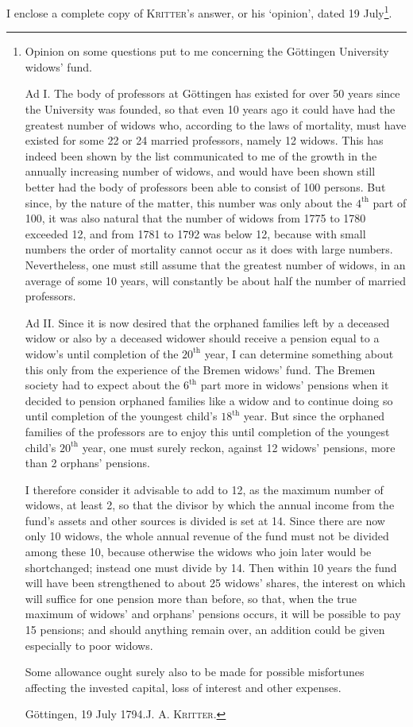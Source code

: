 I enclose a complete copy of \textsc{Kritter}'s answer, or his ‘opinion’, dated 19 July\footnote{Opinion on some questions put to me concerning the Göttingen University widows' fund.

Ad I. The body of professors at Göttingen has existed for over 50 years since the University was founded, so that even 10 years ago it could have had the greatest number of widows who, according to the laws of mortality, must have existed for some 22 or 24 married professors, namely 12 widows. This has indeed been shown by the list communicated to me of the growth in the annually increasing number of widows, and would have been shown still better had the body of professors been able to consist of 100 persons. But since, by the nature of the matter, this number was only about the \(4^{\text{th}}\) part of 100, it was also natural that the number of widows from 1775 to 1780 exceeded 12, and from 1781 to 1792 was below 12, because with small numbers the order of mortality cannot occur as it does with large numbers. Nevertheless, one must still assume that the greatest number of widows, in an average of some 10 years, will constantly be about half the number of married professors.

Ad II. Since it is now desired that the orphaned families left by a deceased widow or also by a deceased widower should receive a pension equal to a widow's until completion of the \(20^{\text{th}}\) year, I can determine something about this only from the experience of the Bremen widows' fund. The Bremen society had to expect about the \(6^{\text{th}}\) part more in widows' pensions when it decided to pension orphaned families like a widow and to continue doing so until completion of the youngest child's \(18^{\text{th}}\) year. But since the orphaned families of the professors are to enjoy this until completion of the youngest child's \(20^{\text{th}}\) year, one must surely reckon, against 12 widows' pensions, more than 2 orphans' pensions.

I therefore consider it advisable to add to 12, as the maximum number of widows, at least 2, so that the divisor by which the annual income from the fund's assets and other sources is divided is set at 14. Since there are now only 10 widows, the whole annual revenue of the fund must not be divided among these 10, because otherwise the widows who join later would be shortchanged; instead one must divide by 14. Then within 10 years the fund will have been strengthened to about 25 widows' shares, the interest on which will suffice for one pension more than before, so that, when the true maximum of widows' and orphans' pensions occurs, it will be possible to pay 15 pensions; and should anything remain over, an addition could be given especially to poor widows.

Some allowance ought surely also to be made for possible misfortunes affecting the invested capital, loss of interest and other expenses.

Göttingen, 19 July 1794.\hfill J. A. \textsc{Kritter}.}.

